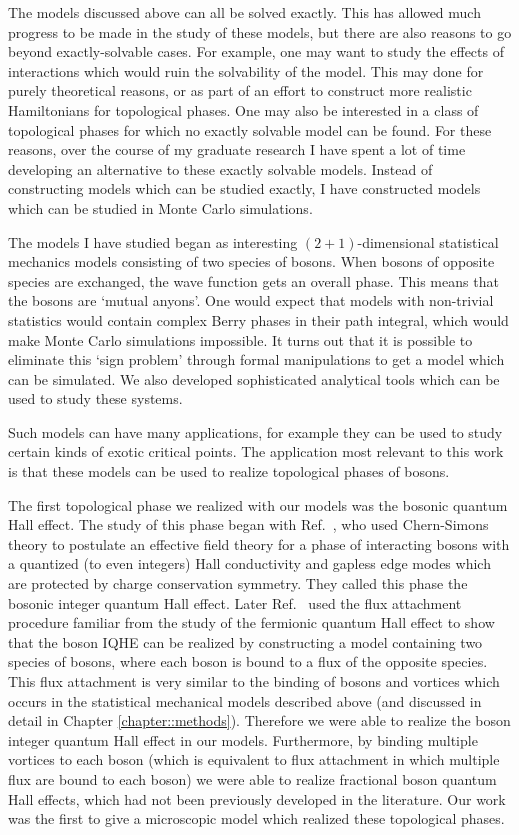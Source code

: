The models discussed above can all be solved exactly. This has allowed much progress to be made in the study of these models, but there are also reasons to go beyond exactly-solvable cases. For example, one may want to study the effects of interactions which would ruin the solvability of the model. This may done for purely theoretical reasons, or as part of an effort to construct more realistic Hamiltonians for topological phases. One may also be interested in a class of topological phases for which no exactly solvable model can be found. For these reasons, over the course of my graduate research I have spent a lot of time developing an alternative to these exactly solvable models. Instead of constructing models which can be studied exactly, I have constructed models which can be studied in Monte Carlo simulations. 

The models I have studied began as interesting $(2+1)$-dimensional statistical mechanics models consisting of two species of bosons. When bosons of opposite species are exchanged, the wave function gets an overall phase. This means that the bosons are `mutual anyons'. One would expect that models with non-trivial statistics would contain complex Berry phases in their path integral, which would make Monte Carlo simulations impossible. It turns out that it is possible to eliminate this `sign problem' through formal manipulations to get a model which can be simulated. We also developed sophisticated analytical tools which can be used to study these systems.

Such models can have many applications, for example they can be used to study certain kinds of exotic critical points. The application most relevant to this work is that these models can be used to realize topological phases of bosons. 

The first topological phase we realized with our models was the bosonic quantum Hall effect. The study of this phase began with Ref.~\cite{LuVishwanath}, who used Chern-Simons theory to postulate an effective field theory for a phase of interacting bosons with a quantized (to even integers) Hall conductivity and gapless edge modes which are protected by charge conservation symmetry. They called this phase the bosonic integer quantum Hall effect. Later Ref.~\cite{SenthilLevin} used the flux attachment procedure familiar from the study of the fermionic quantum Hall effect to show that the boson IQHE can be realized by constructing a model containing two species of bosons, where each boson is bound to a flux of the opposite species. This flux attachment is very similar to the binding of bosons and vortices which occurs in the statistical mechanical models described above (and discussed in detail in Chapter \ref{chapter::methods}). Therefore we were able to realize the boson integer quantum Hall effect in our models. Furthermore, by binding multiple vortices to each boson (which is equivalent to flux attachment in which multiple flux are bound to each boson) we were able to realize fractional boson quantum Hall effects, which had not been previously developed in the literature. Our work was the first to give a microscopic model which realized these topological phases. 


